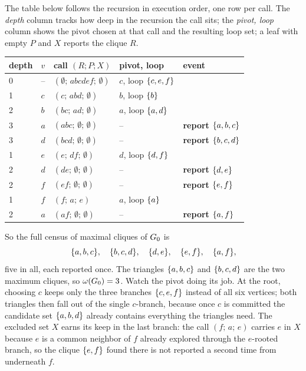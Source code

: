 The table below follows the recursion in execution order, one row per call. The
\emph{depth} column tracks how deep in the recursion the call sits; the
\emph{pivot, loop} column shows the pivot chosen at that call and the resulting
loop set; a leaf with empty $P$ and $X$ reports the clique $R$.

\begin{center}
\renewcommand{\arraystretch}{1.25}
\begin{tabular}{@{}lllll@{}}
\toprule
depth & $v$ & call $(R;P;X)$ & pivot, loop & event \\
\midrule
0 & --   & $(\emptyset;\,abcdef;\,\emptyset)$ & $c$, loop $\{c,e,f\}$ & \\
1 & $c$  & $(c;\,abd;\,\emptyset)$            & $b$, loop $\{b\}$     & \\
2 & $b$  & $(bc;\,ad;\,\emptyset)$            & $a$, loop $\{a,d\}$   & \\
3 & $a$  & $(abc;\,\emptyset;\,\emptyset)$    & --                      & \textbf{report }$\{a,b,c\}$\\
3 & $d$  & $(bcd;\,\emptyset;\,\emptyset)$    & --                      & \textbf{report }$\{b,c,d\}$\\
1 & $e$  & $(e;\,df;\,\emptyset)$             & $d$, loop $\{d,f\}$   & \\
2 & $d$  & $(de;\,\emptyset;\,\emptyset)$     & --                      & \textbf{report }$\{d,e\}$\\
2 & $f$  & $(ef;\,\emptyset;\,\emptyset)$     & --                      & \textbf{report }$\{e,f\}$\\
1 & $f$  & $(f;\,a;\,e)$                      & $a$, loop $\{a\}$      & \\
2 & $a$  & $(af;\,\emptyset;\,\emptyset)$     & --                      & \textbf{report }$\{a,f\}$\\
\bottomrule
\end{tabular}
\end{center}

So the full census of maximal cliques of $G_0$ is
\[
  \{a,b,c\},\quad \{b,c,d\},\quad \{d,e\},\quad \{e,f\},\quad \{a,f\},
\]
five in all, each reported once. The triangles $\{a,b,c\}$ and $\{b,c,d\}$ are
the two maximum cliques, so $\omega(G_0)=3$. Watch the pivot doing its job. At
the root, choosing $c$ keeps only the three branches $\{c,e,f\}$ instead of all
six vertices; both triangles then fall out of the single $c$-branch, because once
$c$ is committed the candidate set $\{a,b,d\}$ already contains everything the
triangles need. The excluded set $X$ earns its keep in the last branch: the call
$(f;\,a;\,e)$ carries $e$ in $X$ because $e$ is a common neighbor of $f$ already
explored through the $e$-rooted branch, so the clique $\{e,f\}$ found there is
not reported a second time from underneath $f$.

